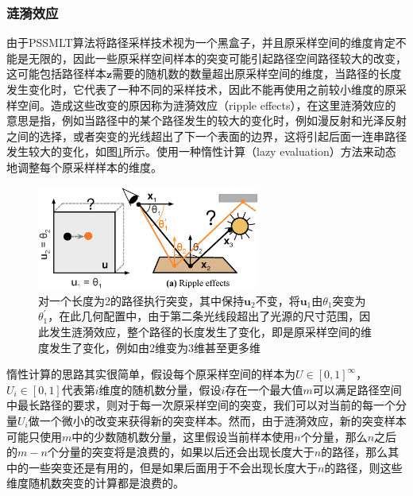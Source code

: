 \subsubsection{涟漪效应}
由于PSSMLT算法将路径采样技术视为一个黑盒子，并且原采样空间的维度肯定不能是无限的，因此一些原采样空间样本的突变可能引起路径空间路径较大的改变，这可能包括路径样本$\mathbf{z}$需要的随机数的数量超出原采样空间的维度，当路径的长度发生变化时，它代表了一种不同的采样技术，因此不能再使用之前较小维度的原采样空间。造成这些改变的原因称为涟漪效应（ripple effects），在这里涟漪效应的意思是指，例如当路径中的某个路径发生的较大的变化时，例如漫反射和光泽反射之间的选择，或者突变的光线超出了下一个表面的边界，这将引起后面一连串路径发生较大的变化，如图\ref{f:mlt-ripple-effects}所示。\cite{a:ASimpleandRobustMutationStrategyfortheMetropolisLightTransportAlgorithm}使用一种惰性计算（lazy evaluation）方法来动态地调整每个原采样样本的维度。

\begin{figure}
	\sidecaption
	\includegraphics[width=0.65\textwidth]{figures/mlt/ripple-effects}
	\caption{对一个长度为2的路径执行突变，其中保持$\mathbf{u}_2$不变，将$\mathbf{u}_1$由$\theta_1$突变为$\theta^{'}_1$，在此几何配置中，由于第二条光线段超出了光源的尺寸范围，因此发生涟漪效应，整个路径的长度发生了变化，即是原采样空间的维度发生了变化，例如由2维变为3维甚至更多维}
	\label{f:mlt-ripple-effects}
\end{figure}

惰性计算的思路其实很简单，假设每个原采样空间的样本为$U\in[0,1]^{\infty}$，$U_i\in[0,1]$代表第$i$维度的随机数分量，假设$i$存在一个最大值$m$可以满足路径空间中最长路径的要求，则对于每一次原采样空间的突变，我们可以对当前的每一个分量$U_i$做一个微小的改变来获得新的突变样本。然而，由于涟漪效应，新的突变样本可能只使用$m$中的少数随机数分量，这里假设当前样本使用$n$个分量，那么$n$之后的$m-n$个分量的突变将是浪费的，如果以后还会出现长度大于$n$的路径，那么其中的一些突变还是有用的，但是如果后面用于不会出现长度大于$n$的路径，则这些维度随机数突变的计算都是浪费的。

